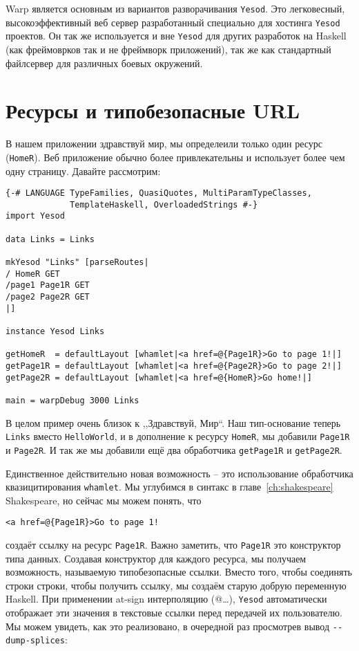 Warp является основным из вариантов разворачивания \texttt{Yesod}. 
Это легковесный, высокоэффективный веб сервер разработанный 
специально для хостинга \texttt{Yesod} проектов. Он так же используется 
и вне \texttt{Yesod} для других разработок на Haskell (как фреймоврков 
так и не фреймворк приложений), так же как стандартный файлсервер 
для различных боевых окружений.

\section{Ресурсы и типобезопасные URL}

В нашем приложении здравствуй мир, мы определеили только один ресурс 
(\lstinline!HomeR!). Веб приложение обычно более привлекательны и  использует более чем одну страницу. Давайте рассмотрим:

\begin{lstlisting}
{-# LANGUAGE TypeFamilies, QuasiQuotes, MultiParamTypeClasses,
             TemplateHaskell, OverloadedStrings #-}
import Yesod

data Links = Links

mkYesod "Links" [parseRoutes|
/ HomeR GET
/page1 Page1R GET
/page2 Page2R GET
|]

instance Yesod Links

getHomeR  = defaultLayout [whamlet|<a href=@{Page1R}>Go to page 1!|]
getPage1R = defaultLayout [whamlet|<a href=@{Page2R}>Go to page 2!|]
getPage2R = defaultLayout [whamlet|<a href=@{HomeR}>Go home!|]

main = warpDebug 3000 Links
\end{lstlisting}

В целом пример очень близок к ,,Здравствуй, Мир``. Наш тип-основание
теперь \lstinline!Links! вместо \lstinline!HelloWorld!, и в дополнение 
к ресурсу \lstinline!HomeR!, мы добавили \lstinline!Page1R! и 
\lstinline!Page2R!. И так же мы добавили ещё 
два обработчика \lstinline!getPage1R! и \lstinline!getPage2R!.

Единственное действительно новая возможность -- это использование обработчика  
квазицитирования \lstinline'whamlet'. Мы углубимся в синтакс в главе~\ref{ch:shakespeare} Shakespeare, но сейчас мы можем понять, что

\begin{lstlisting}
<a href=@{Page1R}>Go to page 1!
\end{lstlisting}

создаёт ссылку на ресурс \lstinline!Page1R!. Важно заметить, что 
\lstinline!Page1R! это конструктор типа данных. Создавая конструктор 
для каждого ресурса, мы получаем возможность, называемую типобезопасные 
ссылки. Вместо того, чтобы соединять строки строки, чтобы получить ссылку,
 мы создаём старую добрую переменную Haskell.
При применении at-sign интерполяцию (@{\ldots}), \texttt{Yesod}
автоматически отображает эти значения в текстовые ссылки перед 
передачей их пользователю. Мы можем увидеть, как это реализовано, 
в очередной раз просмотрев вывод \lstinline!--dump-splices!:

